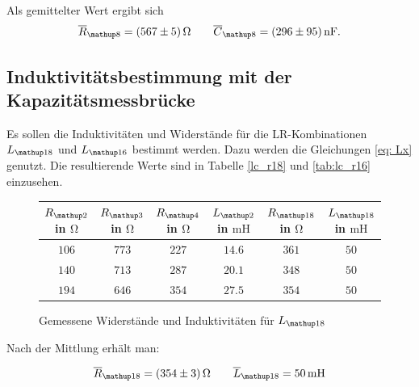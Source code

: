 Als gemittelter Wert ergibt sich
\begin{equation}
\label{eq:wert_r8_c_8}
\overline{R}_{\map{8}}=\SI{567\pm5}{\ohm} \qquad \overline{C}_{\map{8}}=\SI{296\pm95}{\nano\farad}.
\end{equation}

\subsection{Induktivitätsbestimmung mit der Kapazitätsmessbrücke}

Es sollen die Induktivitäten und Widerstände für die LR-Kombinationen $L\ua{18}$ und
$L\ua{16}$ bestimmt werden. Dazu werden die Gleichungen \eqref{eq: Lx} genutzt.
Die resultierende Werte sind in Tabelle \ref{lc_r18} und \ref{tab:lc_r16} einzusehen.

\begin{figure}
\centering
\caption{Gemessene Widerstände und Induktivitäten für $L\ua{18}$}
  \label{tab:lc_r18}
\begin{tabular}{S S S S S S }
    \toprule
    {$R\ua{2}$ in $\si{\ohm}$} &  {$R\ua{3}$ in $\si{\ohm}$} & {$R\ua{4}$ in $\si{\ohm}$} & {$L\ua{2}$ in $\si{\milli\henry}$}& {$R\ua{18}$ in $\si{\ohm}$} &  {$L\ua{18}$ in $\si{\milli\henry}$} \\
    \midrule
     {$\num{106}$} & {$\num{773}$} &  {$\num{227}$}& {$\num{14,6}$}  &  {$\num{361}$} & {$\num{50}$}\\
     {$\num{140}$} & {$\num{713}$}  & {$\num{287}$} & {$\num{20,1}$} & {$\num{348}$} & {$\num{50}$}\\
     {$\num{194}$} & {$\num{646}$}  & {$\num{354}$} & {$\num{27,5}$} &{$\num{354}$} & {$\num{50}$}  \\
    \bottomrule
  \end{tabular}
 \end{figure}
Nach der Mittlung erhält man:

\begin{equation}
\label{eq:wert_r18_l_18}
\overline{R}_{\map{18}}=\SI{354\pm3}{\ohm} \qquad \overline{L}_{\map{18}}=\SI{50}{\milli\henry}
\end{equation}

